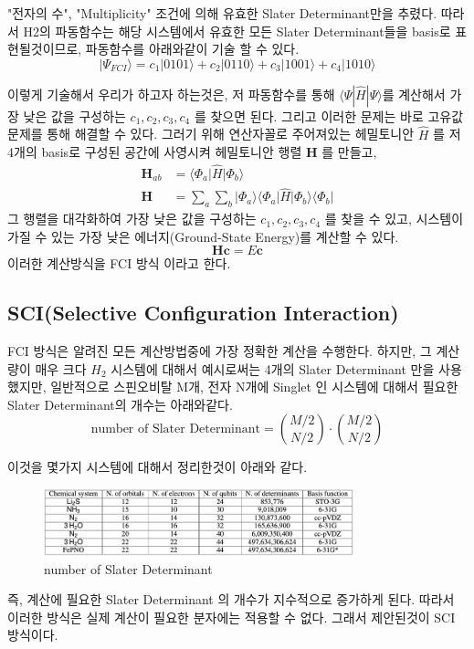 \documentclass[10pt]{article}
\begin{document}
"전자의 수", "Multiplicity" 조건에 의해 유효한 Slater Determinant만을 추렸다. 따라서 H2의 파동함수는 해당 시스템에서 유효한 모든 Slater Determinant들을 basis로 표현될것이므로, 
파동함수를 아래와같이 기술 할 수 있다. 
\[
|\Psi_{FCI} \rangle = c_1|0101\rangle + c_2|0110\rangle + c_3|1001\rangle+ c_4|1010\rangle
\]

이렇게 기술해서 우리가 하고자 하는것은, 저 파동함수를 통해 \(\langle \Psi|\hat{H}|\Psi \rangle\)를 계산해서 가장 낮은 값을 구성하는 \(c_1, c_2, c_3, c_4 \) 를 찾으면 된다.
그리고 이러한 문제는 바로 고유값 문제를 통해 해결할 수 있다. 
그러기 위해 연산자꼴로 주어져있는 헤밀토니안 \(\hat{H}\) 를 저 4개의 basis로 구성된 공간에 사영시켜 헤밀토니안 행렬 \(\mathbf{H}\) 를 만들고, 
\begin{align*}
\mathbf{H}_{ab} &= \langle \Phi_a \vert \hat{H} \vert \Phi_b \rangle \\
\mathbf{H} &= \sum_a \sum_b \vert \Phi_a \rangle \langle \Phi_a \vert \hat{H} \vert \Phi_b \rangle \langle \Phi_b \vert
\end{align*}
그 행렬을 대각화하여 가장 낮은 값을 구성하는 \(c_1, c_2, c_3, c_4 \) 를 찾을 수 있고, 시스템이 가질 수 있는 가장 낮은 에너지(Ground-State Energy)를 계산할 수 있다. 
\[
\mathbf{H}\mathbf{c} = E\mathbf{c}
\]
이러한 계산방식을 FCI 방식 이라고 한다. 

\subsection{SCI(Selective Configuration Interaction)}
FCI 방식은 알려진 모든 계산방법중에 가장 정확한 계산을 수행한다. 하지만, 그 계산량이 매우 크다 \(H_2\) 시스템에 대해서 예시로써는 4개의 Slater Determinant 만을 사용했지만, 
일반적으로 스핀오비탈 M개, 전자 N개에 Singlet 인 시스템에 대해서 필요한 Slater Determinant의 개수는 아래와같다. 
\[
\text{number of Slater Determinant} = \binom{M/2}{N/2}\cdot\binom{M/2}{N/2}
\]

이것을 몇가지 시스템에 대해서 정리한것이 아래와 같다. 

\begin{figure}[htbp]
  \centering
  \includegraphics[width=0.8\textwidth]{fig/numofdet.png}
  \caption{number of Slater Determinant}
  \label{fig:example2}
\end{figure}
즉, 계산에 필요한 Slater Determinant 의 개수가 지수적으로 증가하게 된다. 따라서 이러한 방식은 실제 계산이 필요한 분자에는 적용할 수 없다. 그래서 제안된것이 SCI 방식이다.
\end{document}
